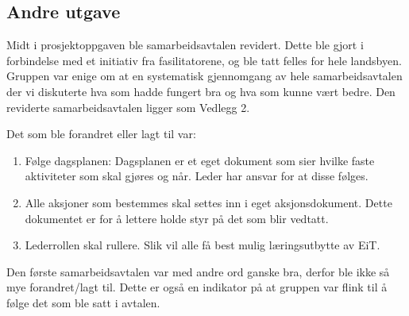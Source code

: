 \subsection*{Andre utgave}
Midt i prosjektoppgaven ble samarbeidsavtalen revidert. 
Dette ble gjort i forbindelse med et initiativ fra fasilitatorene, og ble tatt felles for hele landsbyen. 
Gruppen var enige om at en systematisk gjennomgang av hele samarbeidsavtalen der vi diskuterte hva som hadde fungert bra og hva som kunne vært bedre. 
Den reviderte samarbeidsavtalen ligger som Vedlegg 2. 
\vspace{\secspace}

\noindent Det som ble forandret eller lagt til var: 
\begin{enumerate}
  \item Følge dagsplanen: Dagsplanen er et eget dokument som sier hvilke faste aktiviteter som skal gjøres og når. Leder har ansvar for at disse følges. 
  \item Alle aksjoner som bestemmes skal settes inn i eget aksjonsdokument. Dette dokumentet er for å lettere holde styr på det som blir vedtatt.
  \item Lederrollen skal rullere. Slik vil alle få best mulig læringsutbytte av EiT. 
\end{enumerate}

Den første samarbeidsavtalen var med andre ord ganske bra, derfor ble ikke så mye forandret/lagt til. 
Dette er også en indikator på at gruppen var flink til å følge det som ble satt i avtalen. 
